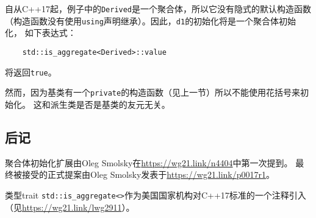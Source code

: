 自从C++17起，例子中的\texttt{Derived}是一个聚合体，所以它没有隐式的默认构造函数
（构造函数没有使用\texttt{using}声明继承）。因此，\texttt{d1}的初始化将是一个聚合体初始化，
如下表达式：
\begin{lstlisting}
    std::is_aggregate<Derived>::value
\end{lstlisting}
将返回\texttt{true}。

然而，因为基类有一个\texttt{private}的构造函数（见上一节）所以不能使用花括号来初始化。
这和派生类是否是基类的友元无关。

\subsection{后记}
聚合体初始化扩展由Oleg Smolsky在\url{https://wg21.link/n4404}中第一次提到。
最终被接受的正式提案由Oleg Smolsky发表于\url{https://wg21.link/p0017r1}。

类型trait \texttt{std::is\_aggregate<>}作为美国国家机构对C++17标准的一个注释引入
（见\url{https://wg21.link/lwg2911}）。

\setcounter{footnote}{0}